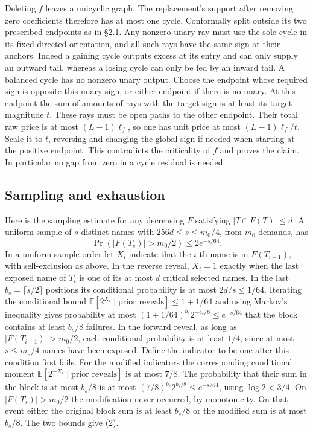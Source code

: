 \documentclass[11pt]{article}
\begin{document}
Deleting \(f\) leaves a unicyclic graph. The replacement's support after removing zero coefficients therefore has at most one cycle. Conformally split outside its two prescribed endpoints as in §2.1. Any nonzero unary ray must use the sole cycle in its fixed directed orientation, and all such rays have the same sign at their anchors. Indeed a gaining cycle outputs excess at its entry and can only supply an outward tail, whereas a losing cycle can only be fed by an inward tail. A balanced cycle has no nonzero unary output. Choose the endpoint whose required sign is opposite this unary sign, or either endpoint if there is no unary. At this endpoint the sum of amounts of rays with the target sign is at least its target magnitude \(t\). These rays must be open paths to the other endpoint. Their total raw price is at most \((L-1)\ell_f\), so one has unit price at most \((L-1)\ell_f/t\). Scale it to \(t\), reversing and changing the global sign if needed when starting at the positive endpoint. This contradicts the criticality of \(f\) and proves the claim. In particular no gap from zero in a cycle residual is needed.

\hypertarget{sampling-and-exhaustion}{%
\subsection{Sampling and exhaustion}\label{sampling-and-exhaustion}}

Here is the sampling estimate for any decreasing \(F\) satisfying \(|T\cap F(T)|\le d\). A uniform sample of \(s\) distinct names with \(256d\le s\le m_0/4\), from \(m_0\) demands, has
\[
 \Pr(|F(T_s)|>m_0/2)\le 2e^{-s/64}.
\tag{2}
\]
In a uniform sample order let \(X_i\) indicate that the \(i\)-th name is in \(F(T_{i-1})\), with self-exclusion as above. In the reverse reveal, \(X_i=1\) exactly when the last exposed name of \(T_i\) is one of its at most \(d\) critical selected names. In the last \(b_s=\lceil s/2\rceil\) positions its conditional probability is at most \(2d/s\le1/64\). Iterating the conditional bound \(\mathbb E[2^{X_i}\mid\text{prior reveals}]\le1+1/64\) and using Markov's inequality gives probability at most \((1+1/64)^{b_s}2^{-b_s/8}\le e^{-s/64}\) that the block contains at least \(b_s/8\) failures. In the forward reveal, as long as \(|F(T_{i-1})|>m_0/2\), each conditional probability is at least \(1/4\), since at most \(s\le m_0/4\) names have been exposed. Define the indicator to be one after this condition first fails. For the modified indicators the corresponding conditional moment \(\mathbb E[2^{-X_i}\mid\text{prior reveals}]\) is at most \(7/8\). The probability that their sum in the block is at most \(b_s/8\) is at most \((7/8)^{b_s}2^{b_s/8}\le e^{-s/64}\), using \(\log 2<3/4\). On \(|F(T_s)|>m_0/2\) the modification never occurred, by monotonicity. On that event either the original block sum is at least \(b_s/8\) or the modified sum is at most \(b_s/8\). The two bounds give (2).
\end{document}
